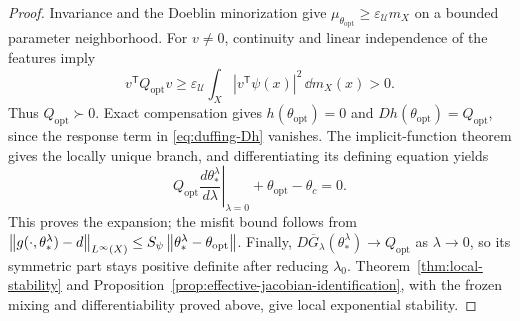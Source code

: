 \begin{proof}
Invariance and the Doeblin minorization give
$\mu_{\theta_{\mathrm{opt}}}\ge\varepsilon_{\mathcal U}m_X$ on a bounded
parameter neighborhood. For $v\ne0$, continuity and linear independence
of the features imply
\[
  v^{\mathsf T}Q_{\mathrm{opt}}v
  \ge\varepsilon_{\mathcal U}\int_X|v^{\mathsf T}\psi(x)|^2\,\dd m_X(x)>0.
\]
Thus $Q_{\mathrm{opt}}\succ0$. Exact compensation gives
$h(\theta_{\mathrm{opt}})=0$ and
$Dh(\theta_{\mathrm{opt}})=Q_{\mathrm{opt}}$, since the response term in
\eqref{eq:duffing-Dh} vanishes. The implicit-function theorem gives the
locally unique branch, and differentiating its defining equation yields
\[
  Q_{\mathrm{opt}}
    \left.\frac{d\theta_*^\lambda}{d\lambda}\right|_{\lambda=0}
    +\theta_{\mathrm{opt}}-\theta_c=0.
\]
This proves the expansion; the misfit bound follows from
$\left\lVert g(\cdot,\theta_*^\lambda)-d\right\rVert_{L^\infty(X)}
\le S_\psi\left\lVert \theta_*^\lambda-\theta_{\mathrm{opt}}\right\rVert$.
Finally, $D\overline G_\lambda(\theta_*^\lambda)\to Q_{\mathrm{opt}}$
as $\lambda\to0$, so its symmetric part stays positive definite after
reducing $\lambda_0$. Theorem~\ref{thm:local-stability} and
Proposition~\ref{prop:effective-jacobian-identification}, with the frozen
mixing and differentiability proved above, give local exponential stability.
\end{proof}


